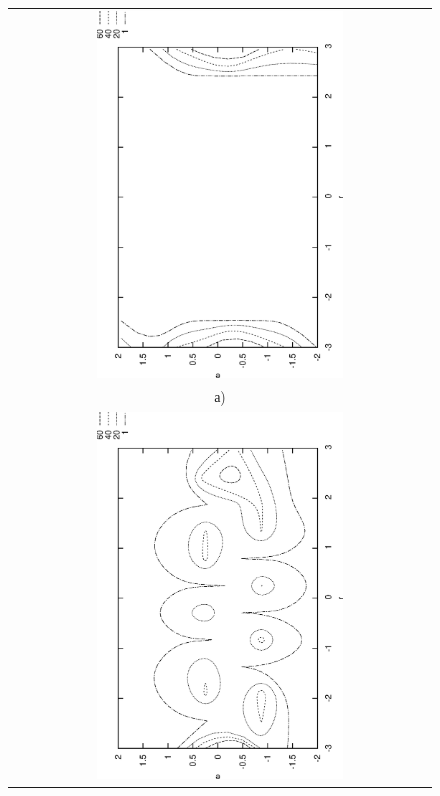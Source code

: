 \begin{figure}
\centering
\begin{tabular}{c}
\includegraphics[angle=270,width=0.6\textwidth,%
  totalheight=0.25\textheight]{step_re2d}\\
а)\\
\includegraphics[angle=270,width=0.6\textwidth,%
  totalheight=0.25\textheight]{harm_re2d}\\

\end{tabular}
\end{figure}
